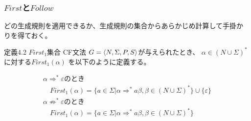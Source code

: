 \documentclass[dvipdfmx]{beamer}
\begin{document}
\begin{frame}
  \frametitle{$First$と$Follow$}

  どの生成規則を適用できるか、生成規則の集合からあらかじめ計算して手掛か
  りを得ておく。

  {\small
  \begin{itembox}[l]{定義4.2 $First_1$集合}
    CF文法 $G=\langle{N,\Sigma,P,S}\rangle$が与えられたとき、
    $\alpha\in(N\cup\Sigma)^\ast$に対する$First_1(\alpha)$
    を以下のように定義する。

    \[
      \begin{array}{l}
        \alpha\Rightarrow^\ast\varepsilon\mbox{のとき}            \\
        \quad First_1(\alpha)=\{a\in\Sigma|\alpha\Rightarrow^\ast
        a\beta,\beta\in(N\cup\Sigma)^\ast\}\cup\{\varepsilon\} \\
        \alpha\not\Rightarrow^\ast\varepsilon\mbox{のとき}        \\
        \quad First_1(\alpha)=\{a\in\Sigma|\alpha\Rightarrow^\ast
        a\beta,\beta\in(N\cup\Sigma)^\ast\}
      \end{array}
    \]
  \end{itembox}}

  \\
\end{frame}
\end{document}
